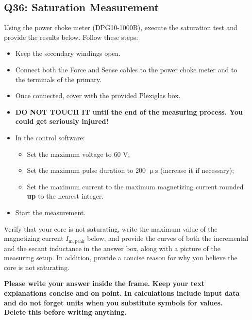 \documentclass{PELsmallreport}
\begin{document}
\subsection{Q36: Saturation Measurement} 
Using the power choke meter (DPG10-1000B), execute the saturation test and provide the results below. 
Follow these steps: 
\begin{itemize}
    \item Keep the secondary windings open.
    \item Connect both the Force and Sense cables to the power choke meter and to the terminals of the primary.
    \item Once connected, cover with the provided Plexiglas box.
    \item \textbf{DO NOT TOUCH IT until the end of the measuring process. You could get seriously injured!}
    \item In the control software: 
    \begin{itemize}
        \item Set the maximum voltage to 60 V;
        \item Set the maximum pulse duration to 200 $\upmu \mathrm{s}$ (increase it if necessary);
        \item Set the maximum current to the maximum magnetizing current rounded \textbf{up} to the nearest integer. 
    \end{itemize}  
    \item Start the measurement.
\end{itemize}

Verify that your core is not saturating, write the maximum value of the magnetizing current $I_\mathrm{m,peak}$ below, and provide the curves of both the incremental and the secant inductance in the answer box, along with a picture of the measuring setup. 
In addition, provide a concise reason for why you believe the core is not saturating.  


\begin{framed}
	\vspace{2em}
	\textbf{Please write your answer inside the frame. Keep your text explanations concise and on point. In calculations include input data and do not forget units when you substitute symbols for values. \\ Delete this before writing anything.}
	\vspace{2em}
\end{framed}


\end{document}
